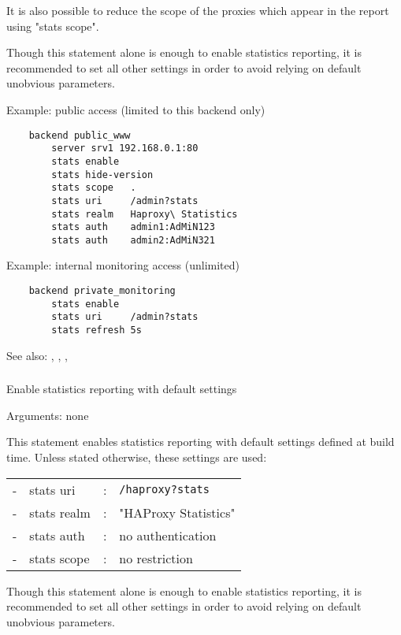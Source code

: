 {  It is also possible to reduce the scope of the proxies which appear in the
  report using "stats scope".

  Though this statement alone is enough to enable statistics reporting, it is
  recommended to set all other settings in order to avoid relying on default
  unobvious parameters.

  Example: public access (limited to this backend only)
  \begin{verbatim}
    backend public_www
        server srv1 192.168.0.1:80
        stats enable
        stats hide-version
        stats scope   .
        stats uri     /admin?stats
        stats realm   Haproxy\ Statistics
        stats auth    admin1:AdMiN123
        stats auth    admin2:AdMiN321
   \end{verbatim}

   Example: internal monitoring access (unlimited)
   \begin{verbatim}
    backend private_monitoring
        stats enable
        stats uri     /admin?stats
        stats refresh 5s
   \end{verbatim}

  See also: , , , 

\subsubsection[stats enable]{}


  Enable statistics reporting with default settings


  Arguments: none

  This statement enables statistics reporting with default settings defined
  at build time. Unless stated otherwise, these settings are used:
  
  \begin{tabular}{llll}
  - & stats uri   & : & \verb|/haproxy?stats| \\
  - & stats realm & : & "HAProxy Statistics" \\
  - & stats auth  & : & no authentication \\
  - & stats scope & : & no restriction \\
  \end{tabular}

  Though this statement alone is enough to enable statistics reporting, it is
  recommended to set all other settings in order to avoid relying on default
  unobvious parameters.

}

